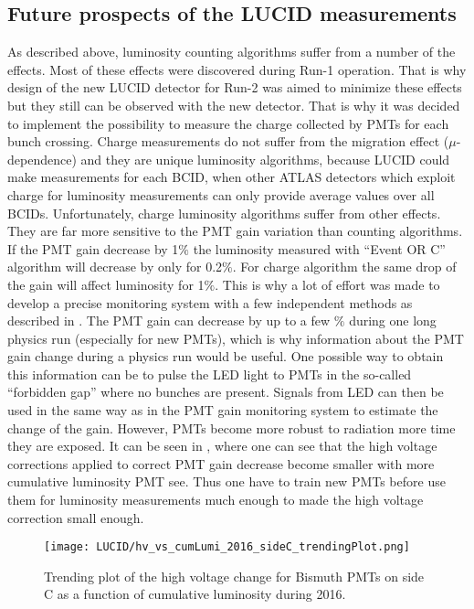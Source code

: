 \subsection{Future prospects of the LUCID measurements}

As described above, luminosity counting algorithms suffer from a number of the effects. Most of these effects were discovered during Run-1 operation.
That is why design of the new LUCID detector for Run-2 was aimed to minimize these effects but they still can be observed with the new detector.
That is why it was decided to implement the possibility to measure the charge collected by PMTs for each bunch crossing.
Charge measurements do not suffer from the migration effect ($\mu$-dependence) and they are unique luminosity algorithms, because
LUCID could make measurements for each BCID, when other ATLAS detectors which exploit charge for luminosity measurements 
can only provide average values over all BCIDs. Unfortunately, charge luminosity algorithms suffer from other effects.
They are far more sensitive to the PMT gain variation than counting algorithms.
If the PMT gain decrease by 1$\%$ the luminosity measured with ``Event OR C'' algorithm will decrease by only for 0.2$\%$.
For charge algorithm the same drop of the gain will affect luminosity for 1$\%$.
This is why a lot of effort was made to develop a precise monitoring system with a few independent methods as described in .
The PMT gain can decrease by up to a few $\%$ during one long physics run (especially for new PMTs), which is why information about the PMT gain change during a physics run would be useful.
One possible way to obtain this information can be to pulse the LED light to PMTs in the so-called ``forbidden gap'' where no bunches are present.
Signals from LED can then be used in the same way as in the PMT gain monitoring system to estimate the change of the gain.
However, PMTs become more robust to radiation more time they are exposed. It can be seen in , where one can see that the high voltage corrections
applied to correct PMT gain decrease become smaller with more cumulative luminosity PMT see. Thus one have to train new PMTs before use them for luminosity measurements much enough
to made the high voltage correction small enough.
\begin{figure}
\centering
\texttt{[image: LUCID/hv\_vs\_cumLumi\_2016\_sideC\_trendingPlot.png]}
\caption{
Trending plot of the high voltage change for Bismuth PMTs on side C as a function of cumulative luminosity during 2016.
}
\label{fig:hv_vs_cumLumi}
\end{figure}

